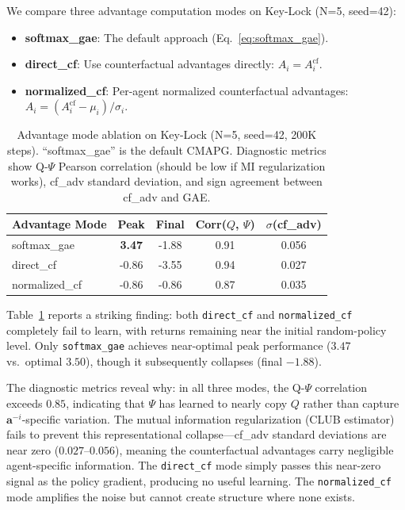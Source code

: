 \documentclass[journal]{IEEEtran}
\begin{document}
We compare three advantage computation modes on Key-Lock (N=5, seed=42):
\begin{itemize}
    \item \textbf{softmax\_gae}: The default approach (Eq.~\ref{eq:softmax_gae}).
    \item \textbf{direct\_cf}: Use counterfactual advantages directly: $A_i = A_i^{\text{cf}}$.
    \item \textbf{normalized\_cf}: Per-agent normalized counterfactual advantages: $A_i = (A_i^{\text{cf}} - \mu_i) / \sigma_i$.
\end{itemize}

\begin{table}[t]
\centering
\caption{Advantage mode ablation on Key-Lock (N=5, seed=42, 200K steps). ``softmax\_gae'' is the default CMAPG. Diagnostic metrics show Q-$\Psi$ Pearson correlation (should be low if MI regularization works), cf\_adv standard deviation, and sign agreement between cf\_adv and GAE.}
\label{tab:adv_mode}
\begin{tabular}{lcccc}
\toprule
\textbf{Advantage Mode} & \textbf{Peak} & \textbf{Final} & \textbf{Corr($Q$, $\Psi$)} & $\sigma$(cf\_adv) \\
\midrule
softmax\_gae & \textbf{3.47} & -1.88 & 0.91 & 0.056 \\
direct\_cf & -0.86 & -3.55 & 0.94 & 0.027 \\
normalized\_cf & -0.86 & -0.86 & 0.87 & 0.035 \\
\bottomrule
\end{tabular}
\end{table}

Table~\ref{tab:adv_mode} reports a striking finding: both \texttt{direct\_cf} and \texttt{normalized\_cf} completely fail to learn, with returns remaining near the initial random-policy level. Only \texttt{softmax\_gae} achieves near-optimal peak performance ($3.47$ vs.\ optimal $3.50$), though it subsequently collapses (final $-1.88$).

The diagnostic metrics reveal why: in all three modes, the Q-$\Psi$ correlation exceeds $0.85$, indicating that $\Psi$ has learned to nearly copy $Q$ rather than capture $\mathbf{a}^{-i}$-specific variation. The mutual information regularization (CLUB estimator) fails to prevent this representational collapse---cf\_adv standard deviations are near zero ($0.027$--$0.056$), meaning the counterfactual advantages carry negligible agent-specific information. The \texttt{direct\_cf} mode simply passes this near-zero signal as the policy gradient, producing no useful learning. The \texttt{normalized\_cf} mode amplifies the noise but cannot create structure where none exists.
\end{document}
